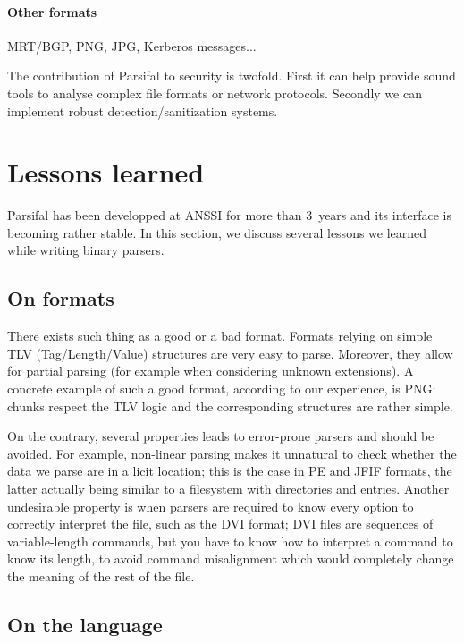 \documentclass[conference]{IEEEtran}
\begin{document}
\paragraph{Other formats} MRT/BGP, PNG, JPG, Kerberos messages...


\bigskip

The contribution of Parsifal to security is twofold. First it can help
provide sound tools to analyse complex file formats or network
protocols. Secondly we can implement robust detection/sanitization
systems.



\section{Lessons learned}

Parsifal has been developped at ANSSI for more than 3~years and its
interface is becoming rather stable. In this section, we discuss
several lessons we learned while writing binary parsers.

\subsection*{On formats}

There exists such thing as a good or a bad format. Formats relying on
simple TLV (Tag/Length/Value) structures are very easy to
parse. Moreover, they allow for partial parsing (for example when
considering unknown extensions). A concrete example of such a good
format, according to our experience, is PNG: chunks respect the TLV
logic and the corresponding structures are rather simple.

On the contrary, several properties leads to error-prone parsers and
should be avoided. For example, non-linear parsing makes it unnatural
to check whether the data we parse are in a licit location; this is
the case in PE and JFIF formats, the latter actually being similar to
a filesystem with directories and entries. Another undesirable
property is when parsers are required to know every option to
correctly interpret the file, such as the DVI format; DVI files are
sequences of variable-length commands, but you have to know how to
interpret a command to know its length, to avoid command misalignment
which would completely change the meaning of the rest of the file.


\subsection*{On the language}
\end{document}
